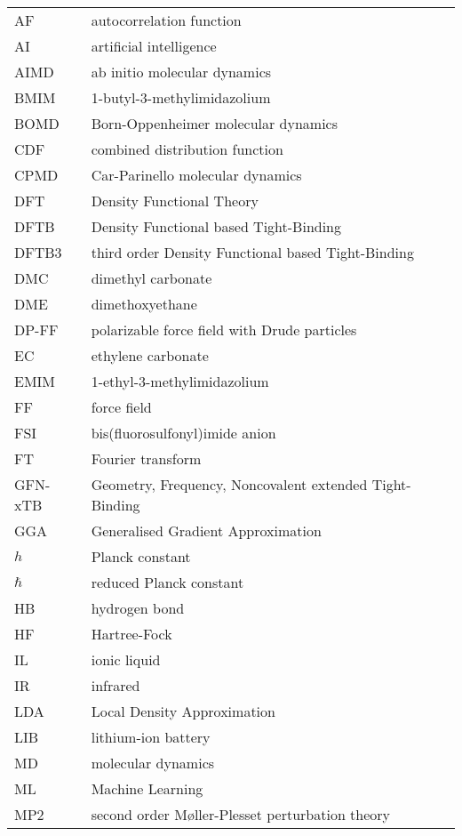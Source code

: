 
\begin{longtable}{ll}
    AF & autocorrelation function \\
    AI & artificial intelligence \\
    AIMD & ab initio molecular dynamics \\
    BMIM & 1-butyl-3-methylimidazolium \\
    BOMD & Born-Oppenheimer molecular dynamics \\
    CDF & combined distribution function \\
    CPMD & Car-Parinello molecular dynamics \\
    DFT & Density Functional Theory \\
    DFTB & Density Functional based Tight-Binding \\
    DFTB3 & third order Density Functional based Tight-Binding \\
    DMC & dimethyl carbonate \\
    DME & dimethoxyethane \\
    DP-FF & polarizable force field with Drude particles \\
    EC & ethylene carbonate \\
    EMIM & 1-ethyl-3-methylimidazolium \\
    FF & force field \\
    FSI & bis(fluorosulfonyl)imide anion \\
    FT & Fourier transform \\
    GFN-xTB & Geometry, Frequency, Noncovalent extended Tight-Binding \\
    GGA & Generalised Gradient Approximation \\
    $h$ & Planck constant \\
    $\hbar$ & reduced Planck constant \\
    HB & hydrogen bond \\
    HF & Hartree-Fock \\
    IL & ionic liquid \\
    IR & infrared \\
    LDA & Local Density Approximation \\
    LIB & lithium-ion battery \\
    MD & molecular dynamics \\
    ML & Machine Learning \\
    MP2 & second order M{\o}ller-Plesset perturbation theory \\

\end{longtable}
